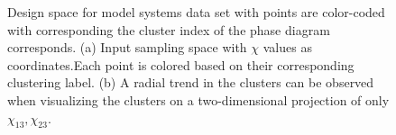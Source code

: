 \begin{figure}[h]
\begin{subfigure}[b]{0.4\textwidth}
        \caption{}
        \label{fig:synth_designspace_2D}
     \end{subfigure}
    \caption{Design space for model systems data set with points are color-coded with corresponding the cluster index of the phase diagram corresponds. (a) Input sampling space with \(\chi\) values as coordinates.Each point is colored based on their corresponding clustering label. (b) A radial trend in the clusters can be observed when visualizing the clusters on a two-dimensional projection of only \(\chi_{13}, \chi_{23}\).}
    \label{fig:synth_designspace}
\end{figure}
